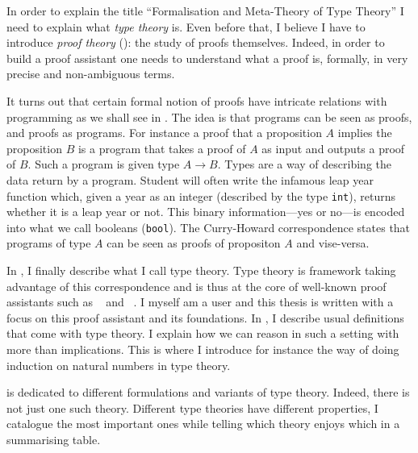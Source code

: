 In order to explain the title ``Formalisation and Meta-Theory of Type Theory''
I need to explain what \emph{type theory} is. Even before that, I believe I have
to introduce \emph{proof theory} (): the study of proofs
themselves. Indeed, in order to build a proof assistant one needs to understand
what a proof is, formally, \ie in very precise and non-ambiguous terms.

It turns out that certain formal notion of proofs have intricate relations with
programming as we shall see in . The idea is that programs
can be seen as proofs, and proofs as programs.
For instance a proof that a proposition \(A\) implies the proposition \(B\)
is a program that takes a proof of \(A\) as input and outputs a proof of \(B\).
Such a program is given type \(A \to B\). Types are a way of describing the data
return by a program. Student will often write the infamous leap year function
which, given a year as an integer (described by the type
\texttt{int}), returns whether it is a leap year or not. This binary
information---yes or no---is encoded into what we call booleans
(\texttt{bool}).
The Curry-Howard correspondence states that programs of type \(A\) can be seen
as proofs of propositon \(A\) and vise-versa.

In , I finally describe what I call type theory.
Type theory is framework taking advantage of this correspondence and is thus at
the core of well-known proof assistants such as \Coq~ and
\Agda~. I myself am a \Coq user and this
thesis is written with a focus on this proof assistant and its foundations.
In , I describe usual definitions that come with type theory.
I explain how we can reason in such a setting with more than implications.
%
This is where I introduce for instance the way of doing induction on natural
numbers in type theory.

 is dedicated to different formulations and variants of type
theory. Indeed, there is not just one such theory. Different type theories have
different properties, I catalogue the most important ones while telling which
theory enjoys which in a summarising table.

